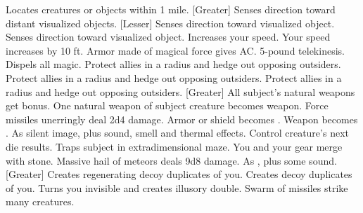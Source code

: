     {Locates creatures or objects within 1 mile.}
[Greater]
    {Senses direction toward distant visualized objects.}
[Lesser]
    {Senses direction toward visualized object.}
    {Senses direction toward visualized object.}
    {Increases your speed.}
    {Your speed increases by 10 ft.}
    {Armor made of magical force gives  AC.}
    {5-pound telekinesis.}
    {Dispels all magic.}
    {Protect allies in a \areamed radius and hedge out opposing outsiders.}
    {Protect allies in a \areamed radius and hedge out opposing outsiders.}
    {Protect allies in a \areamed radius and hedge out opposing outsiders.}
[Greater]
    {All subject's natural weapons get  bonus.}
    {One natural weapon of subject creature becomes  weapon.}
    {Force missiles unerringly deal 2d4 damage.}
    {Armor or shield becomes .}
    {Weapon becomes .}
    {As silent image, plus sound, smell and thermal effects.}
    {Control creature's next die results.}
    {Traps subject in extradimensional maze.}
    {You and your gear merge with stone.}
    {Massive hail of meteors deals 9d8 damage.}
    {As , plus some sound.}
[Greater]
    {Creates regenerating decoy duplicates of you.}
    {Creates decoy duplicates of you.}
    {Turns you invisible and creates illusory double.}
    {Swarm of missiles strike many creatures.}

